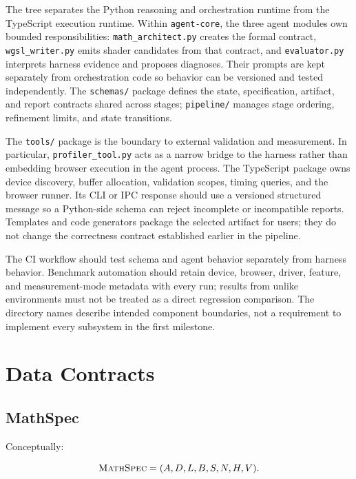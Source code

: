 \documentclass[11pt,a4paper,oneside]{report}
\newcommand{\MathSpec}{\textsc{MathSpec}}
\begin{document}
The tree separates the Python reasoning and orchestration runtime from the TypeScript execution
runtime. Within \texttt{agent-core}, the three agent modules own bounded responsibilities:
\texttt{math\_architect.py} creates the formal contract, \texttt{wgsl\_writer.py} emits shader
candidates from that contract, and \texttt{evaluator.py} interprets harness evidence and proposes
diagnoses. Their prompts are kept separately from orchestration code so behavior can be versioned
and tested independently. The \texttt{schemas/} package defines the state, specification,
artifact, and report contracts shared across stages; \texttt{pipeline/} manages stage ordering,
refinement limits, and state transitions.

The \texttt{tools/} package is the boundary to external validation and measurement. In particular,
\texttt{profiler\_tool.py} acts as a narrow bridge to the harness rather than embedding browser
execution in the agent process. The TypeScript package owns device discovery, buffer allocation,
validation scopes, timing queries, and the browser runner. Its CLI or IPC response should use a
versioned structured message so a Python-side schema can reject incomplete or incompatible
reports. Templates and code generators package the selected artifact for users; they do not
change the correctness contract established earlier in the pipeline.

The CI workflow should test schema and agent behavior separately from harness behavior. Benchmark
automation should retain device, browser, driver, feature, and measurement-mode metadata with every
run; results from unlike environments must not be treated as a direct regression comparison. The
directory names describe intended component boundaries, not a requirement to implement every
subsystem in the first milestone.

\chapter{Data Contracts}

\section{MathSpec}

Conceptually:

\begin{equation}
\MathSpec =
(
A,D,L,B,S,N,H,V
).
\end{equation}
\end{document}
